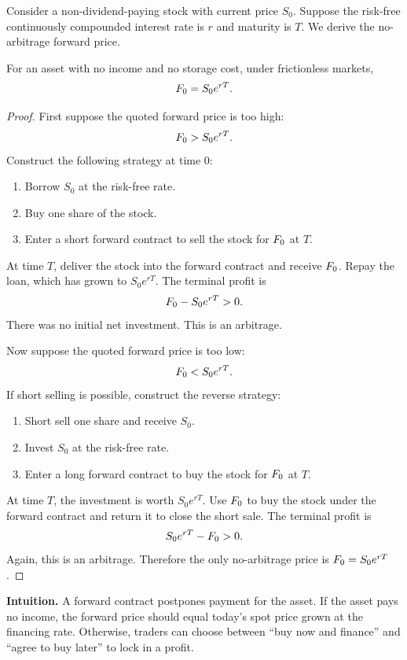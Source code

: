 Consider a non-dividend-paying stock with current price $S_0$. Suppose the
risk-free continuously compounded interest rate is $r$ and maturity is $T$. We
derive the no-arbitrage forward price.

\begin{thmN}
For an asset with no income and no storage cost, under frictionless markets,
\[
    F_0 = S_0 e^{rT}.
\]
\end{thmN}

\begin{proof}
First suppose the quoted forward price is too high:
\[
    F_0 > S_0 e^{rT}.
\]
Construct the following strategy at time 0:
\begin{enumerate}
    \item Borrow $S_0$ at the risk-free rate.
    \item Buy one share of the stock.
    \item Enter a short forward contract to sell the stock for $F_0$ at $T$.
\end{enumerate}
At time $T$, deliver the stock into the forward contract and receive $F_0$.
Repay the loan, which has grown to $S_0e^{rT}$. The terminal profit is
\[
    F_0-S_0e^{rT} > 0.
\]
There was no initial net investment. This is an arbitrage.

Now suppose the quoted forward price is too low:
\[
    F_0 < S_0 e^{rT}.
\]
If short selling is possible, construct the reverse strategy:
\begin{enumerate}
    \item Short sell one share and receive $S_0$.
    \item Invest $S_0$ at the risk-free rate.
    \item Enter a long forward contract to buy the stock for $F_0$ at $T$.
\end{enumerate}
At time $T$, the investment is worth $S_0e^{rT}$. Use $F_0$ to buy the stock
under the forward contract and return it to close the short sale. The terminal
profit is
\[
    S_0e^{rT}-F_0 > 0.
\]
Again, this is an arbitrage. Therefore the only no-arbitrage price is
$F_0=S_0e^{rT}$.
\end{proof}

\begin{boxF}
\textbf{Intuition.} A forward contract postpones payment for the asset. If the
asset pays no income, the forward price should equal today's spot price grown at
the financing rate. Otherwise, traders can choose between ``buy now and finance''
and ``agree to buy later'' to lock in a profit.
\end{boxF}


